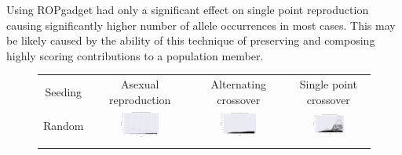 \documentclass{article}
\begin{document}
Using ROPgadget had only a significant effect on single point reproduction causing significantly higher number of allele occurrences in most cases. This may be likely caused by the ability of this technique of preserving and composing highly scoring contributions to a population member.


\pagestyle{empty}
\begin{landscape}
\begin{figure}[t]
\begin{center}
\begin{tabular}{c c c c}
    Seeding & Asexual reproduction & Alternating crossover & Single point crossover \\
    Random & \includegraphics[align=c,width=0.42\textwidth]{ac/e1/1} & \includegraphics[align=c,width=0.42\textwidth]{ac/e1/2} & \includegraphics[align=c,width=0.42\textwidth]{ac/e1/3} \\
    & & & \\

\end{tabular}
\end{center}
\end{figure}
\end{landscape}
\end{document}
